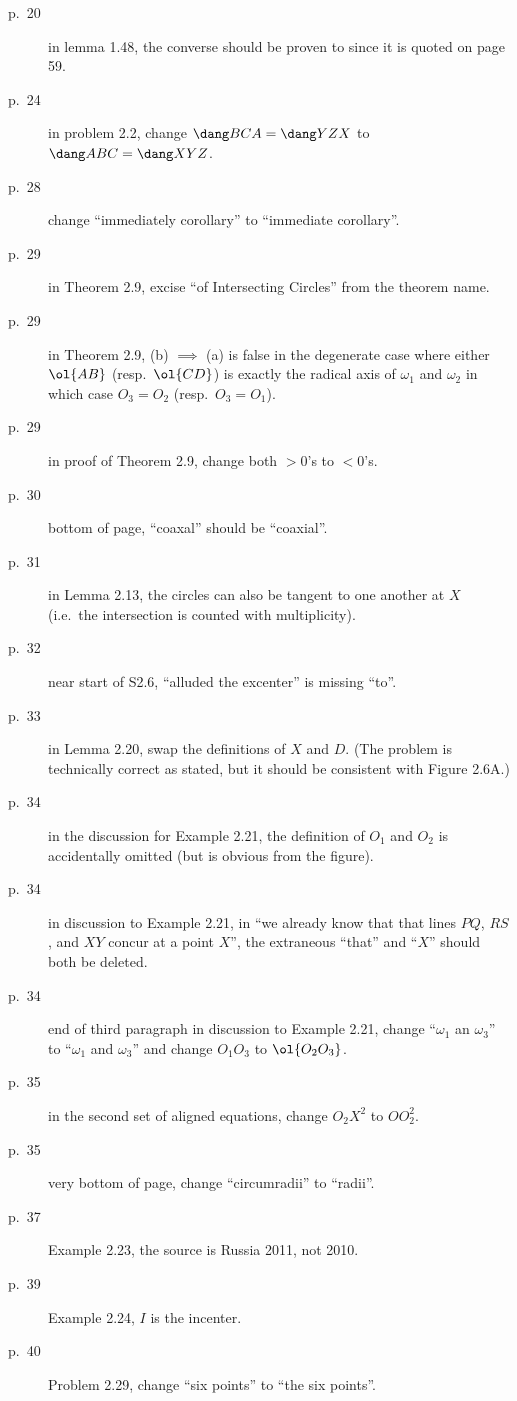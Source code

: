 \documentclass[11pt]{scrartcl}
\begin{document}
\begin{description}
\item[p.\  20] in lemma 1.48, the converse should be proven to since it is quoted on page 59.
\item[p.\  24] in problem 2.2, change $\dang BCA = \dang YZX$
  to $\dang ABC = \dang XYZ$.
\item[p.\  28] change ``immediately corollary'' to ``immediate corollary''.
\item[p.\  29] in Theorem 2.9, excise ``of Intersecting Circles'' from the theorem name.
\item[p.\  29] in Theorem 2.9, (b) $\implies$ (a) is false in the degenerate case
  where either $\ol{AB}$ (resp.\ $\ol{CD}$) is exactly the radical axis of $\omega_1$ and $\omega_2$
  in which case $O_3 = O_2$ (resp.\ $O_3 = O_1$).
\item[p.\  29] in proof of Theorem 2.9, change both $>0$'s to $<0$'s.
\item[p.\  30] bottom of page, ``coaxal'' should be ``coaxial''.
\item[p.\  31] in Lemma 2.13, the circles can also be tangent
  to one another at $X$ (i.e.\ the intersection is counted with multiplicity).
\item[p.\  32] near start of S2.6, ``alluded the excenter'' is missing ``to''.
\item[p.\  33] in Lemma 2.20, swap the definitions of $X$ and $D$.
  (The problem is technically correct as stated,
  but it should be consistent with Figure 2.6A.)
\item[p.\  34] in the discussion for Example 2.21,
  the definition of $O_1$ and $O_2$ is accidentally omitted (but is obvious from the figure).
\item[p.\  34] in discussion to Example 2.21, in
  ``we already know that that lines $PQ$, $RS$, and $XY$ concur at a point $X$'',
  the extraneous ``that'' and ``$X$'' should both be deleted.
\item[p.\  34] end of third paragraph in discussion to Example 2.21,
  change ``$\omega_1$ an $\omega_3$'' to ``$\omega_1$ and $\omega_3$''
  and change $O_1O_3$ to $\ol{O_2O_3}$.
\item[p.\  35] in the second set of aligned equations,
  change $O_2X^2$ to $OO_2^2$.
\item[p.\  35] very bottom of page, change ``circumradii'' to ``radii''.
\item[p.\  37] Example 2.23, the source is Russia 2011, not 2010.
\item[p.\  39] Example 2.24, $I$ is the incenter.
\item[p.\  40] Problem 2.29, change ``six points'' to ``the six points''.

\end{description}
\end{document}
